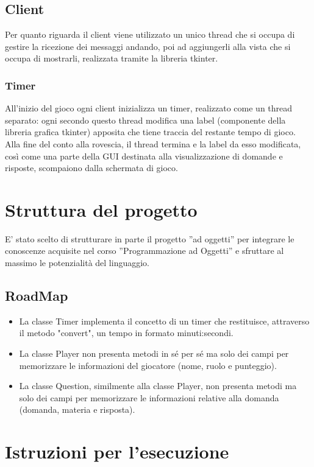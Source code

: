 \documentclass[a4paper,12pt]{report}
\begin{document}
\section{Client}
Per quanto riguarda il client viene utilizzato un unico thread che si occupa di gestire la ricezione
dei messaggi andando, poi ad aggiungerli alla vista che si occupa di mostrarli, realizzata tramite
la libreria tkinter.

\subsection{Timer}
All'inizio del gioco ogni client inizializza un timer, realizzato come un thread separato:
ogni secondo questo thread modifica una label (componente della libreria grafica tkinter)
apposita che tiene traccia del restante tempo di gioco.
Alla fine del conto alla rovescia, il thread termina e la label da esso modificata, così come una
parte della GUI destinata alla visualizzazione di domande e risposte, scompaiono dalla schermata di gioco.


\chapter{Struttura del progetto}
E' stato scelto di strutturare in parte il progetto ”ad oggetti” per integrare le conoscenze
acquisite nel corso ”Programmazione ad Oggetti” e sfruttare al massimo le potenzialità del linguaggio.

\section{RoadMap}
\begin{itemize}
	\item La classe Timer implementa il concetto di un timer che restituisce, attraverso il metodo "convert",
			un tempo in formato minuti:secondi.
	\item La classe Player non presenta metodi in sé per sé ma solo dei campi per memorizzare le informazioni
			del giocatore (nome, ruolo e punteggio).
	\item La classe Question, similmente alla classe Player, non presenta metodi ma solo dei campi per memorizzare
			le informazioni relative alla domanda (domanda, materia e risposta).
\end{itemize}


\chapter{Istruzioni per l'esecuzione}
\end{document}
